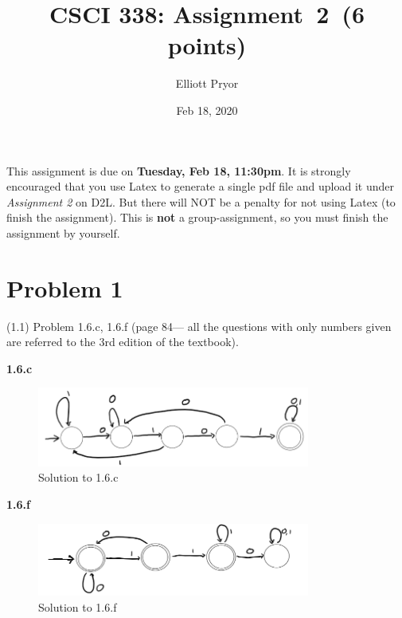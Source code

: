 \documentclass[11pt]{article}
\begin{document}
\date{Feb 18, 2020}
\title{CSCI 338: Assignment~2~(6 points)}

\author{Elliott Pryor}


\maketitle

\noindent
This assignment is due on {\bf Tuesday, Feb 18, 11:30pm}. It is strongly
encouraged that you use Latex to generate a single pdf file and upload it
under {\em Assignment 2} on D2L. But there will NOT be a penalty for not
using Latex (to finish the assignment). This is {\bf not} a group-assignment,
so you must finish the assignment by yourself.

\newpage
\section*{Problem 1}

\noindent
(1.1) Problem 1.6.c, 1.6.f (page 84---
all the questions with only numbers given are referred to the 3rd edition of the textbook).
\newline

\textbf{1.6.c}

 \begin{figure}[H]
     \centering
     \includegraphics[width = 0.8\textwidth]{16c_CSCI338.PNG}
     \caption{Solution to 1.6.c}
     \label{fig:1.6.c}
 \end{figure}
 
\textbf{1.6.f}
  \begin{figure}[H]
     \centering
     \includegraphics[width = 0.8\textwidth]{16f_CSCI338.PNG}
     \caption{Solution to 1.6.f}
     \label{fig:1.6.f}
 \end{figure}
\end{document}

